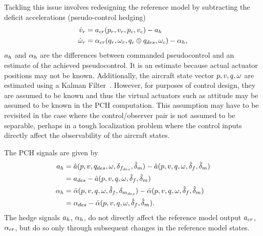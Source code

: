 Tackling this issue involves redesigning the reference model by subtracting the deficit accelerations (pseudo-control hedging)
\begin{align}
\label{e:pddrm}
\dot{v}_{r} &= a_{cr} (p_{r},v_{r},p_c,v_c) - a_{h} \\
\label{e:qddrm} \dot{\omega}_{r} &= \alpha_{cr}(q_{r},\omega_{r},q_c\oplus q_{des},\omega_c) -
\alpha_{h},
\end{align}
$a_{h}$ and $\alpha_{h}$ are the differences between commanded pseudocontrol
and an estimate of the achieved pseudocontrol. It is an estimate because actual actuator positions may not be known. Additionally, the aircraft state vector $p,v,q,\omega$ are estimated using a Kalman Filter~\cite{henrik:jacic:2006,chowdhary:gnc11:2011}. However, for purposes of control design, they are assumed to be known and thus the virtual actuators such as attitude may be assumed to be known in the PCH computation. This assumption may have to be revisited in the case where the control/observer pair is not assumed to be separable, perhaps in a tough localization problem where the control inputs directly affect the observability of the aircraft states.

The PCH signals are given by
%
\begin{align} \label{e:ah}
a_{h}   &= \hat{a} (p,v,q_{des},\omega,\delta_{f_{des}},\hat{\delta}_m) - \hat{a}(p,v,q,\omega,\hat{\delta}_f,\hat{\delta}_m) \nonumber \\
      &= a_{des}                                - \hat{a}(p,v,q,\omega,\hat{\delta}_f,\hat{\delta}_m)\\
\label{e:alh}
\alpha_{h}  &= \hat{\alpha}(p,v,q,\omega,\hat{\delta}_f,\delta_{m_{des}}) - \hat{\alpha}(p,v,q,\omega,\hat{\delta}_f,\hat{\delta}_m)\nonumber\\
      &= \alpha_{des}                   -
      \hat{\alpha}(p,v,q,\omega,\hat{\delta}_f,\hat{\delta}_m).
\end{align}
%
The hedge signals $a_{h}$, $\alpha_{h}$, do not directly affect
the reference model output $a_{cr}$, $\alpha_{cr}$, but do so only
through subsequent changes in the reference model states.

